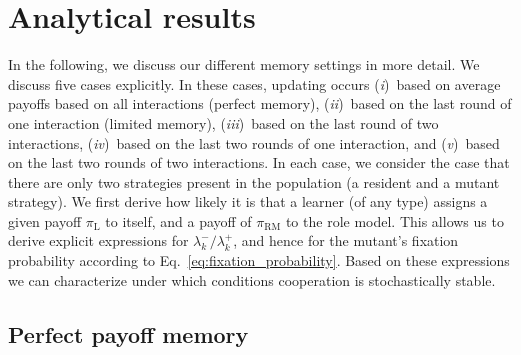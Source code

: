 \documentclass[11pt]{article}
\def\rolemodel{\text{RM}}
\def\learner{\text{L}}
\theoremstyle{plainCl1}
\theoremstyle{plainCl2}
\begin{document}
\newpage


\section{Analytical results}
\label{section:analyticalresults}


In the following, we discuss our different memory settings in more detail. 
We discuss five cases explicitly. In these cases, updating occurs
({\it i})~based on average payoffs based on all interactions (perfect memory), 
({\it ii})~based on the last round of one interaction (limited memory), 
({\it iii})~based on the last round of two interactions,
({\it iv})~based on the last two rounds of one interaction, and 
({\it v})~based on the last two rounds of two interactions. 
In each case, we consider the case that there are only two strategies present in the population (a resident and a mutant strategy). 
We first derive how likely it is that a learner (of any type) assigns a given payoff $\pi_\learner$ to itself, and a payoff of $\pi_\rolemodel$ to the role model. 
This allows us to derive explicit expressions for $\lambda^-_k/\lambda^+_k$, and hence for the mutant's fixation probability according to Eq.~\eqref{eq:fixation_probability}.
Based on these expressions we can characterize under which conditions cooperation is stochastically stable.  



\subsection{Perfect payoff memory}\label{section:perfect_memory}

\end{document}
